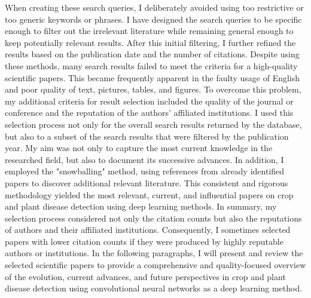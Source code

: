 \documentclass{BachelorBUI}
\begin{document}
When creating these search queries, I deliberately avoided using too restrictive or too generic keywords or phrases. I have designed the search queries to be specific enough to filter out the irrelevant literature while remaining general enough to keep potentially relevant results. After this initial filtering, I further refined the results based on the publication date and the number of citations. Despite using these methods, many search results failed to meet the criteria for a high-quality scientific papers. This became frequently apparent in the faulty usage of English and poor quality of text, pictures, tables, and figures. To overcome this problem, my additional criteria for result selection included the quality of the journal or conference and the reputation of the authors' affiliated institutions. I used this selection process not only for the overall search results returned by the database, but also to a subset of the search results that were filtered by the publication year. My aim was not only to capture the most current knowledge in the researched field, but also to document its successive advances. In addition, I employed the "snowballing" method, using references from already identified papers to discover additional relevant literature. This consistent and rigorous methodology yielded the most relevant, current, and influential papers on crop and plant disease detection using deep learning methods. In summary, my selection process considered not only the citation counts but also the reputations of authors and their affiliated institutions. Consequently, I sometimes selected papers with lower citation counts if they were produced by highly reputable authors or institutions. In the following paragraphs, I will present and review the selected scientific papers to provide a comprehensive and quality-focused overview of the evolution, current advances, and future perspectives in crop and plant disease detection using convolutional neural networks as a deep learning method.
\end{document}
